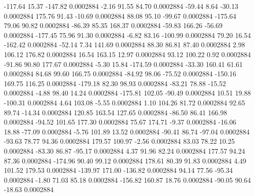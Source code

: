      -117.64       15.37     -147.82     0.0002884
       -2.16       91.55       84.70     0.0002884
      -59.44        8.64      -30.13     0.0002884
      175.76       91.43      -10.69     0.0002884
       88.08       95.10      -99.67     0.0002884
     -175.64       79.06       90.82     0.0002884
      -86.39       85.35      168.37     0.0002884
      -59.83      166.26      -56.69     0.0002884
     -177.45       75.96       91.30     0.0002884
       -6.82       83.16     -100.99     0.0002884
       79.20       16.54     -162.42     0.0002884
      -52.14        7.34      141.69     0.0002884
       88.30       86.81       87.40     0.0002884
        2.98      106.12      176.82     0.0002884
       16.54      163.15       12.97     0.0002884
       93.12      100.22        0.92     0.0002884
      -91.86       90.80      177.67     0.0002884
       -5.30       15.84     -174.59     0.0002884
      -33.30      160.41       61.61     0.0002884
       84.68       99.60      166.75     0.0002884
      -84.92       98.06      -75.52     0.0002884
     -150.16      169.75      116.25     0.0002884
     -179.18       82.30       98.93     0.0002884
      -83.21       78.88      -15.52     0.0002884
       -4.88       98.40       14.24     0.0002884
     -175.81      102.05      -90.49     0.0002884
       10.51       19.88     -100.31     0.0002884
        4.64      103.08       -5.55     0.0002884
        1.10      104.26       81.72     0.0002884
       92.65       89.74      -14.34     0.0002884
      120.85      163.54      127.65     0.0002884
      -86.50       86.41      166.98     0.0002884
      -94.52      101.65      177.30     0.0002884
       75.67      174.71       -9.37     0.0002884
      -16.06       18.88      -77.09     0.0002884
       -5.76      101.89       13.52     0.0002884
      -90.41       86.74      -97.04     0.0002884
      -93.63       78.77       94.36     0.0002884
      179.57      100.97       -2.56     0.0002884
       83.03       78.22       10.25     0.0002884
      -83.30       86.87      -95.17     0.0002884
        4.37       91.96       82.24     0.0002884
      177.57       94.24       87.36     0.0002884
     -174.96       90.40       99.12     0.0002884
      178.61       80.39       91.83     0.0002884
        4.49      101.52      179.53     0.0002884
     -139.97      171.00     -136.82     0.0002884
       94.14       77.56      -95.34     0.0002884
       -1.80       71.03       85.18     0.0002884
     -156.82      160.87       18.76     0.0002884
      -90.05       90.64      -18.63     0.0002884
